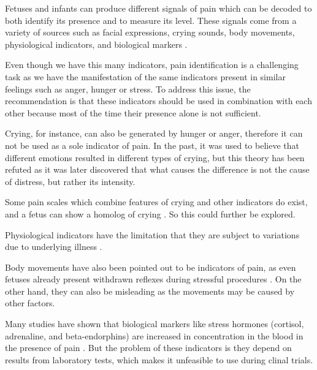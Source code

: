 Fetuses and infants can produce different signals of pain which can be decoded to both identify its presence and to measure its level. These signals come from a variety of sources such as facial expressions, crying sounds, body movements, physiological indicators, and biological markers \citep{Bellieni2012}. 

Even though we have this many indicators, pain identification is a challenging task as we have the manifestation of the same indicators present in similar feelings such as anger, hunger or stress. To address this issue, the recommendation is that these indicators should be used in combination with each other because most of the time their presence alone is not sufficient. 

Crying, for instance, can also be generated by hunger or anger, therefore it can not be used as a sole indicator of pain. In the past, it was used to believe that different emotions resulted in different types of crying, but this theory has been refuted as it was later discovered that what causes the difference is not the cause of distress, but rather its intensity. 

Some pain scales which combine features of crying and other indicators do exist, and a fetus can show a homolog of crying \citep{Gingras2005}. So this could further be explored. \cite{abs-1909-02543}


Physiological indicators have the limitation that they are subject to variations due to underlying illness \citep{sweet1998physiological}.

Body movements have also been pointed out to be indicators of pain, as even fetuses already present withdrawn reflexes during stressful procedures \citep{Zimmermann1991}. On the other hand, they can also be misleading as the movements may be caused by other factors. 

Many studies have shown that biological markers like stress hormones (cortisol, adrenaline, and beta-endorphins) are increased in concentration in the blood in the presence of pain \citep{giannakoulopoulos1994fetal}. But the problem of these indicators is they depend on results from laboratory tests, which makes it unfeasible to use during clinal trials.


